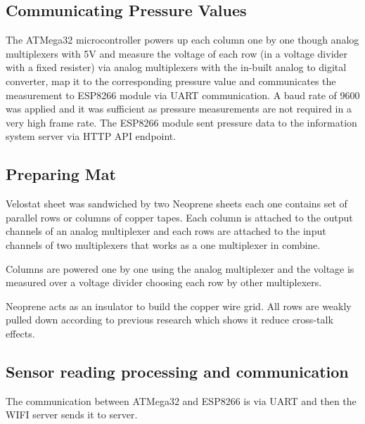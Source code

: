 \subsection{Communicating Pressure Values} 

The ATMega32 microcontroller powers up each column one by one though analog multiplexers with 5V and measure the voltage of each row (in a voltage divider with a fixed resister) via analog multiplexers with the in-built analog to digital converter, map it to the corresponding pressure value and communicates the measurement to ESP8266 module via UART communication. A baud rate of 9600 was applied and it was sufficient as pressure measurements are not required in a very high frame rate. The ESP8266 module sent pressure data to the information system server via HTTP API endpoint.


\subsection{Preparing Mat}

Velostat sheet was sandwiched by two Neoprene sheets each one contains set of parallel rows or columns of copper tapes. Each column is attached to the output channels of an analog multiplexer and each rows are attached to the input channels of two multiplexers that works as a one multiplexer in combine. 



Columns are powered one by one using the analog multiplexer and the voltage is measured over a voltage divider choosing each row by other multiplexers. 

Neoprene acts as an insulator to build the copper wire grid. All rows are weakly pulled down according to previous research which shows it reduce cross-talk effects.

\subsection{Sensor reading processing and communication}
The communication between ATMega32 and ESP8266 is via UART and then the WIFI server sends it to server. 






